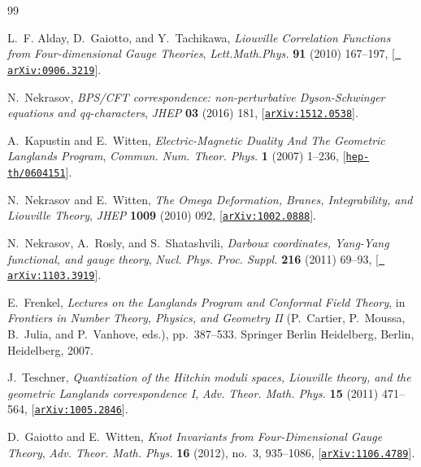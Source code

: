 \renewcommand{\refname}{参考文献}
\begin{thebibliography}{99}

L.~F. Alday, D.~Gaiotto, and Y.~Tachikawa, {\it {Liouville Correlation
  Functions from Four-dimensional Gauge Theories}},  {\em Lett.Math.Phys.} {\bf
  91} (2010) 167--197, [\href{http://xxx.lanl.gov/abs/0906.3219}{{\tt
  arXiv:0906.3219}}].

N.~Nekrasov, {\it {BPS/CFT correspondence: non-perturbative Dyson-Schwinger
  equations and qq-characters}},  {\em JHEP} {\bf 03} (2016) 181,
  [\href{http://xxx.lanl.gov/abs/1512.0538}{{\tt arXiv:1512.0538}}].

A.~Kapustin and E.~Witten, {\it {Electric-Magnetic Duality And The Geometric
  Langlands Program}},  {\em Commun. Num. Theor. Phys.} {\bf 1} (2007) 1--236,
  [\href{http://xxx.lanl.gov/abs/hep-th/0604151}{{\tt hep-th/0604151}}].

N.~Nekrasov and E.~Witten, {\it {The Omega Deformation, Branes, Integrability,
  and Liouville Theory}},  {\em JHEP} {\bf 1009} (2010) 092,
  [\href{http://xxx.lanl.gov/abs/1002.0888}{{\tt arXiv:1002.0888}}].

N.~Nekrasov, A.~Rosly, and S.~Shatashvili, {\it {Darboux coordinates, Yang-Yang
  functional, and gauge theory}},  {\em Nucl. Phys. Proc. Suppl.} {\bf 216}
  (2011) 69--93, [\href{http://xxx.lanl.gov/abs/1103.3919}{{\tt
  arXiv:1103.3919}}].

E.~Frenkel, {\it Lectures on the Langlands Program and Conformal Field Theory},
   in {\em Frontiers in Number Theory, Physics, and Geometry II} (P.~Cartier,
  P.~Moussa, B.~Julia, and P.~Vanhove, eds.), pp.~387--533.
\newblock Springer Berlin Heidelberg, Berlin, Heidelberg, 2007.

J.~Teschner, {\it {Quantization of the Hitchin moduli spaces, Liouville theory,
  and the geometric Langlands correspondence I}},  {\em Adv. Theor. Math.
  Phys.} {\bf 15} (2011) 471--564,
  [\href{http://xxx.lanl.gov/abs/1005.2846}{{\tt arXiv:1005.2846}}].

D.~Gaiotto and E.~Witten, {\it {Knot Invariants from Four-Dimensional Gauge
  Theory}},  {\em Adv. Theor. Math. Phys.} {\bf 16} (2012), no.~3, 935--1086,
  [\href{http://xxx.lanl.gov/abs/1106.4789}{{\tt arXiv:1106.4789}}].


\end{thebibliography}
